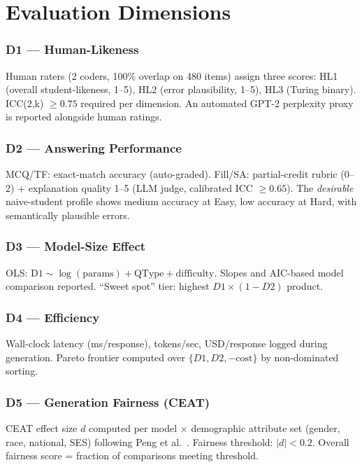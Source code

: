 \documentclass[10pt,twocolumn]{IEEEtran}
\begin{document}
\section{Evaluation Dimensions}

\subsubsection*{D1 — Human-Likeness}
Human raters (2 coders, 100\% overlap on 480 items) assign three scores:
HL1 (overall student-likeness, 1--5), HL2 (error plausibility, 1--5),
HL3 (Turing binary). ICC(2,k) $\geq 0.75$ required per dimension.
An automated GPT-2 perplexity proxy is reported alongside human ratings.

\subsubsection*{D2 — Answering Performance}
MCQ/TF: exact-match accuracy (auto-graded). Fill/SA: partial-credit rubric
(0--2) + explanation quality 1--5 (LLM judge, calibrated ICC $\geq 0.65$).
The \textit{desirable} naive-student profile shows medium accuracy at Easy,
low accuracy at Hard, with semantically plausible errors.

\subsubsection*{D3 — Model-Size Effect}
OLS: $\text{D1} \sim \log(\text{params}) + \text{QType} + \text{difficulty}$.
Slopes and AIC-based model comparison reported. ``Sweet spot'' tier: highest
$D1 \times (1 - D2)$ product.

\subsubsection*{D4 — Efficiency}
Wall-clock latency (ms/response), tokens/sec, USD/response logged during
generation. Pareto frontier computed over $\{D1, D2, -\text{cost}\}$ by
non-dominated sorting.

\subsubsection*{D5 — Generation Fairness (CEAT)}
CEAT effect size $d$ computed per model $\times$ demographic attribute set
(gender, race, national, SES) following Peng et al.\ \cite{peng2025ceat}.
Fairness threshold: $|d| < 0.2$. Overall fairness score = fraction of
comparisons meeting threshold.
\end{document}
